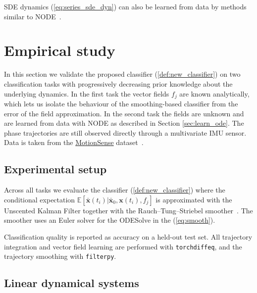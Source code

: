 \documentclass[referee, pdflatex, sn-mathphys-num]{sn-jnl}
\theoremstyle{definition}
\theoremstyle{plain}
\newcommand{\bx}{\ensuremath{\mathbf{x}}}
\newcommand{\bbx}{\ensuremath{\bar{\mathbf{x}}}}
\begin{document}
	SDE dynamics (\ref{eq:series_sde_dyn}) can also be learned from data by methods similar to NODE~\cite{pmlr-v108-li20i, NEURIPS2021_9ba196c7}.
	
	\section{Empirical study}\label{Experiment}
	
	In this section we validate the proposed classifier (\ref{def:new_classifier}) on two classification tasks with progressively decreasing prior knowledge about the underlying dynamics. In the first task the vector fields $f_j$ are known analytically, which lets us isolate the behaviour of the smoothing-based classifier from the error of the field approximation. In the second task the fields are unknown and are learned from data with NODE as described in Section \ref{sec:learn_ode}. The phase trajectories are still observed directly through a multivariate IMU sensor. Data is taken from the \href{https://github.com/mmalekzadeh/motion-sense}{MotionSense} dataset~\cite{Malekzadeh:2019:MSD:3302505.3310068}.
	
	\subsection{Experimental setup}\label{sec:exp_setup}
	
	Across all tasks we evaluate the classifier (\ref{def:new_classifier}) where the conditional expectation $\mathbb{E}[\bbx(t_i) | \bbx_0, \bx(t_i), f_j]$ is approximated with the Unscented Kalman Filter together with the Rauch--Tung--Striebel smoother~\cite{bayes_filter_smooth}. The smoother uses an Euler solver for the ODESolve in the (\ref{eq:smooth}).
	
	Classification quality is reported as accuracy on a held-out test set. All trajectory integration and vector field learning are performed with \texttt{torchdiffeq}, and the trajectory smoothing with \texttt{filterpy}.
	
	\subsection{Linear dynamical systems}\label{sec:exp_chaotic}
	
\end{document}
